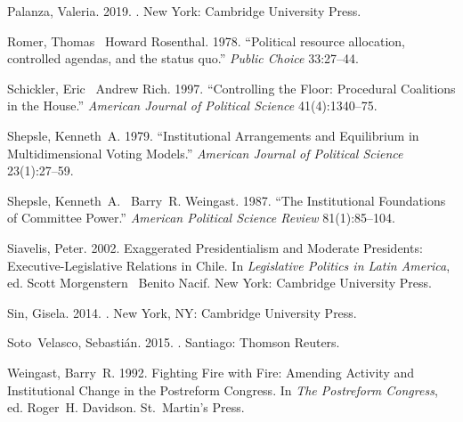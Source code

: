 \documentclass[letter,12pt]{article}
\begin{document}
\begin{thebibliography}{xx}
Palanza, Valeria. 2019.
.
\newblock New York:  Cambridge University Press.

Romer, Thomas \harvardand\ Howard Rosenthal. 1978.
\newblock ``Political resource allocation, controlled agendas, and the status
  quo.'' {\em Public Choice} 33:27--44.

Schickler, Eric \harvardand\ Andrew Rich. 1997.
\newblock ``Controlling the Floor: Procedural Coalitions in the {H}ouse.'' {\em
  American Journal of Political Science} 41(4):1340--75.

Shepsle, Kenneth~A. 1979.
\newblock ``Institutional Arrangements and Equilibrium in Multidimensional
  Voting Models.'' {\em American Journal of Political Science} 23(1):27--59.

Shepsle, Kenneth~A. \harvardand\ Barry~R. Weingast. 1987.
\newblock ``The Institutional Foundations of Committee Power.'' {\em American
  Political Science Review} 81(1):85--104.

Siavelis, Peter. 2002.
\newblock Exaggerated Presidentialism and Moderate Presidents:
  Executive-Legislative Relations in {Chile}.  In {\em Legislative Politics in
  Latin America}, ed. Scott Morgenstern \harvardand\ Benito Nacif.
\newblock New York:  Cambridge University Press.

Sin, Gisela. 2014.
.
\newblock New York, NY:  Cambridge University Press.

Soto~Velasco, Sebasti\'an. 2015.
.
\newblock Santiago:  Thomson Reuters.

Weingast, Barry~R. 1992.
\newblock Fighting Fire with Fire: Amending Activity and Institutional Change
  in the Postreform Congress.  In {\em The Postreform Congress}, ed. Roger~H.
  Davidson.
\newblock St.\ Martin's Press.

\end{thebibliography}
\end{document}
